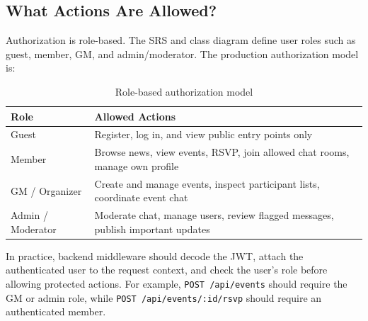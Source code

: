 \documentclass[12pt,a4paper]{article}
\begin{document}
\subsection{What Actions Are Allowed?}
Authorization is role-based. The SRS and class diagram define user roles such as guest,
member, GM, and admin/moderator. The production authorization model is:
\begin{table}[H]
\centering
\caption{Role-based authorization model}
\begin{tabularx}{\textwidth}{@{}l X@{}}
\toprule
\textbf{Role} & \textbf{Allowed Actions} \\
\midrule
Guest & Register, log in, and view public entry points only \\
Member & Browse news, view events, RSVP, join allowed chat rooms, manage own profile \\
GM / Organizer & Create and manage events, inspect participant lists, coordinate event chat \\
Admin / Moderator & Moderate chat, manage users, review flagged messages, publish important updates \\
\bottomrule
\end{tabularx}
\end{table}
In practice, backend middleware should decode the JWT, attach the authenticated user to
the request context, and check the user's role before allowing protected actions. For
example, \texttt{POST /api/events} should require the GM or admin role, while
\texttt{POST /api/events/:id/rsvp} should require an authenticated member.
\end{document}
